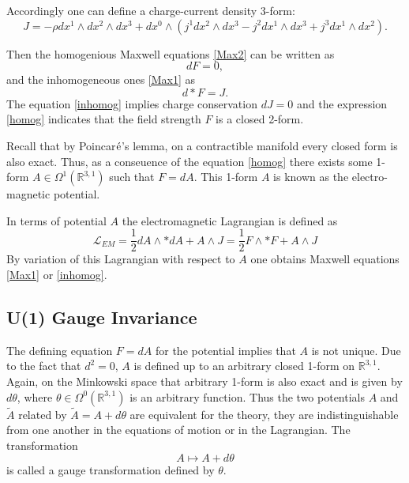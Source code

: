 \documentclass[11pt]{report}
\theoremstyle{plain}
\theoremstyle{definition}
\theoremstyle{remark}
\theoremstyle{remark}
\numberwithin{equation}{section}
\begin{document}
Accordingly one can define a charge-current density 3-form:
%
\begin{equation}
J = -\rho dx^1\wedge dx^2\wedge dx^3 + dx^0\wedge (j^1dx^2\wedge dx^3 - j^2 dx^1\wedge dx^3 +j^3dx^1\wedge dx^2). 
\end{equation}
%

Then the homogenious Maxwell equations \eqref{Max2} can be written as
%
\begin{equation}\label{homog}
dF=0,
\end{equation}
and the inhomogeneous ones \eqref{Max1} as 
%
\begin{equation}\label{inhomog}
d\ast F=J.
\end{equation}
%
The equation \eqref{inhomog} implies charge conservation $dJ=0$ and the expression \eqref{homog} indicates that the field strength $F$ is a closed 2-form.

Recall that by Poincar$\rm \acute{e}$\rq{}s lemma, on a contractible manifold every closed form is also exact. Thus, as a conseuence of the  equation \eqref{homog} there exists some 1-form $A \in \Omega^1(\mathbb{R}^{3,1})$ such that $F=dA$. This 1-form $A$ is known as the electro-magnetic potential. 

In terms of potential $A$ the electromagnetic Lagrangian is defined as
%
\begin{equation}
\mathcal{L}_{EM} = \frac{1}{2}dA\wedge \ast dA + A\wedge J = \frac{1}{2}F\wedge \ast F + A\wedge J
\end{equation}
By variation of this Lagrangian with respect to $A$ one obtains Maxwell equations \eqref{Max1} or \eqref{inhomog}.



\subsection{U(1) Gauge Invariance}

The defining equation $F=dA$ for the potential implies that $A$ is not unique. Due to the fact that $d^2 =0$, $A$ is defined up to an arbitrary closed 1-form on $\mathbb{R}^{3,1}$. Again, on the Minkowski space that arbitrary 1-form is also exact and is given by $d\theta$, where $\theta\in \Omega^0(\mathbb{R}^{3,1})$ is an arbitrary function. Thus the two potentials $A$ and $\tilde{A}$ related by $\tilde{A} = A + d\theta$ are equivalent for the theory, they are indistinguishable from one another in the equations of motion or in the Lagrangian. 
The transformation 
%
\begin{equation}\label{GTEM}
A \longmapsto A + d\theta
\end{equation} 
%
is called a gauge transformation defined by $\theta$. 
\end{document}
